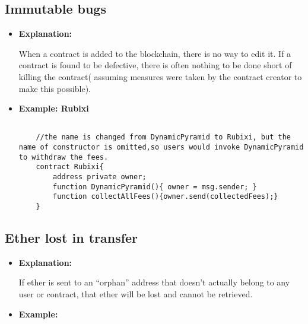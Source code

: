 \documentclass{llncs}
\begin{document}
\subsection{Immutable bugs}
\begin{itemize}
\item \textbf{Explanation:} 

When a contract is added to the blockchain, there is no way to edit it. If a contract is found to be defective, there is often nothing to be done short of killing the contract( assuming measures were taken by the contract creator to make this possible).

\item \textbf{Example: Rubixi}

	\begin{minipage}{.5\textwidth} 
	{\scriptsize
	\begin{verbatim}
	
	//the name is changed from DynamicPyramid to Rubixi, but the name of constructor is omitted,so users would invoke DynamicPyramid to withdraw the fees.
	contract Rubixi{
	    address private owner;
	    function DynamicPyramid(){ owner = msg.sender; }
	    function collectAllFees(){owner.send(collectedFees);}
	}

	\end{verbatim} }
	\end{minipage}	

\end{itemize}

\subsection{Ether lost in transfer}
\begin{itemize}
\item \textbf{Explanation:} 

If ether is sent to an “orphan” address that doesn’t actually belong to any user or contract, that ether will be lost and cannot be retrieved.

\item \textbf{Example:}

\end{itemize}
\end{document}
